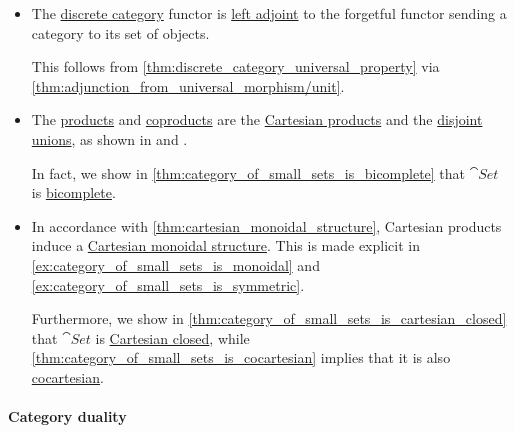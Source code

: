 \begin{remark}
\begin{itemize}
    This is stated in \cref{thm:universal_sets}.

    \item The \hyperref[def:discrete_category]{discrete category} functor is \hyperref[def:adjoint_functor]{left adjoint} to the forgetful functor sending a category to its set of objects.

    This follows from \cref{thm:discrete_category_universal_property} via \cref{thm:adjunction_from_universal_morphism/unit}.

    \item The \hyperref[def:categorical_product]{products} and \hyperref[def:categorical_coproduct]{coproducts} are the \hyperref[def:cartesian_product]{Cartesian products} and the \hyperref[def:disjoint_union]{disjoint unions}, as shown in  and .

    In fact, we show in \cref{thm:category_of_small_sets_is_bicomplete} that \( \cat{Set} \) is \hyperref[def:bicomplete_category]{bicomplete}.

    \item In accordance with \cref{thm:cartesian_monoidal_structure}, Cartesian products induce a \hyperref[def:cartesian_monoidal_category]{Cartesian monoidal structure}. This is made explicit in \cref{ex:category_of_small_sets_is_monoidal} and \cref{ex:category_of_small_sets_is_symmetric}.

    Furthermore, we show in \cref{thm:category_of_small_sets_is_cartesian_closed} that \( \cat{Set} \) is \hyperref[def:cartesian_closed_category]{Cartesian closed}, while \cref{thm:category_of_small_sets_is_cocartesian} implies that it is also \hyperref[def:cocartesian_monoidal_category]{cocartesian}.
  \end{itemize}
\end{remark}

\paragraph{Category duality}

